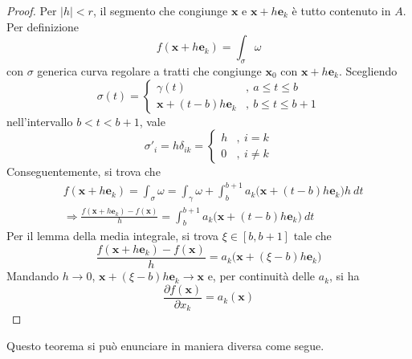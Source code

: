 \documentclass[11pt, a4paper]{scrartcl}
\theoremstyle{definition}
\numberwithin{esempio}{section}
\theoremstyle{definition}
\numberwithin{obs}{section}
\numberwithin{nota}{section}
\numberwithin{equation}{subsection}
\begin{document}
\begin{teorema}
\begin{proof}
		Per $\lvert h \rvert < r$, il segmento che congiunge $\mathbf{x}$ e $ \mathbf{x} + h\mathbf{e} _k$ \`e tutto contenuto in $A$.
		Per definizione
		\[
		f(\mathbf{x} +h\mathbf{e} _k) = \int_{\sigma } \omega
		\] 
	con $\sigma $ generica curva regolare a tratti che congiunge $\mathbf{x} _0$ con $\mathbf{x} +h\mathbf{e} _k$.
	Scegliendo 
	\[
	\sigma (t) = \begin{cases}
		\gamma(t) &,\ a\le t\le b\\
		\mathbf{x} + (t-b)h \mathbf{e} _k &,\ b\le t\le b+1
	\end{cases}
	\] 
	nell'intervallo $b<t<b+1$, vale
	\[
	\sigma '_i = h \delta _{ik} = \begin{cases}
		h &,\ i = k\\
		0 &,\ i\neq k
	\end{cases}
	\] 
	Conseguentemente, si trova che
	\[
		\begin{split}
			&f(\mathbf{x} +h \mathbf{e} _k) = \int_{\sigma } \omega = \int_{\gamma} \omega + \int_{b} ^{b+1} a_k \big(\mathbf{x} +(t-b) h\mathbf{e} _k\big) h \ dt\\
			&\Rightarrow \frac{f(\mathbf{x} +h\mathbf{e} _k) - f(\mathbf{x} )}{h} = \int_{b} ^{b+1} a_k \big(\mathbf{x} +(t-b)h \mathbf{e} _k\big) \ dt
		\end{split}
	\] 
	Per il lemma della media integrale, si trova $\xi \in \left[ b,b+1 \right] $ tale che
	\[
		 \frac{f(\mathbf{x} +h\mathbf{e} _k) - f(\mathbf{x} )}{h} =  a_k \big(\mathbf{x} +(\xi -b)h \mathbf{e} _k\big) 
	\] 
	Mandando $h\to  0$, $\mathbf{x} + (\xi -b) h \mathbf{e} _k \to \mathbf{x} $ e, per continuit\`a delle $a_k$, si ha
	\[
	\frac{\partial f(\mathbf{x} )}{\partial x_k} = a_k(\mathbf{x} )
	\] 
	\end{proof}
\end{teorema}
\noindent Questo teorema si pu\`o enunciare in maniera diversa come segue.
\end{document}
